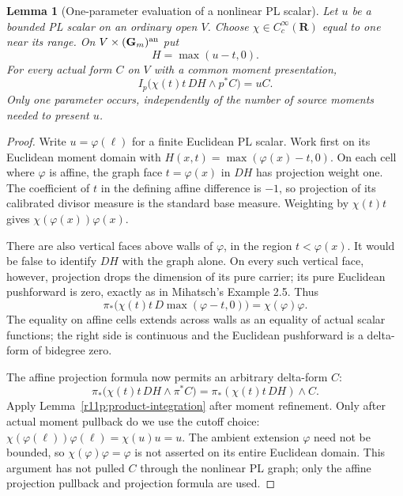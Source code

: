 \documentclass[11pt,a4paper]{article}
\newtheorem{lemma}[theorem]{Lemma}
\theoremstyle{definition}
\theoremstyle{remark}
\begin{document}
\begin{lemma}[One-parameter evaluation of a nonlinear PL scalar]
\label{r11p:one-parameter}
Let $u$ be a bounded PL scalar on an ordinary open $V$.  Choose
$\chi\in C_c^\infty(\mathbf R)$ equal to one near its range.  On
$V\times(\mathbf G_m)^{\rm an}$ put
\[
                         H=\max(u-t,0).
\]
For every actual form $C$ on $V$ with a common moment presentation,
\[
                  I_p\bigl(\chi(t)t\,DH\wedge p^*C\bigr)=uC.
\tag{MT8}\label{r11p:graph-evaluation}
\]
Only one parameter occurs, independently of the number of source
moments needed to present $u$.
\end{lemma}

\begin{proof}
Write $u=\varphi(\ell)$ for a finite Euclidean PL scalar.  Work first
on its Euclidean moment domain with $H(x,t)=\max(\varphi(x)-t,0)$.
On each cell where $\varphi$ is affine, the graph face $t=\varphi(x)$
in $DH$ has projection weight one.  The coefficient of $t$ in the
defining affine difference is $-1$, so projection of its calibrated
divisor measure is the standard base measure.  Weighting by $\chi(t)t$
gives $\chi(\varphi(x))\varphi(x)$.

There are also vertical faces above walls of $\varphi$, in the region
$t<\varphi(x)$.  It would be false to identify $DH$ with the graph
alone.  On every such vertical face, however, projection drops the
dimension of its pure carrier; its pure Euclidean pushforward is
zero, exactly as in Mihatsch's Example 2.5.  Thus
\[
               \pi_*\bigl(\chi(t)t\,D\max(\varphi-t,0)\bigr)
                                  =\chi(\varphi)\varphi.
\]
The equality on affine cells extends across walls as an equality of
actual scalar functions; the right side is continuous and the
Euclidean pushforward is a delta-form of bidegree zero.

The affine projection formula now permits an arbitrary delta-form
$C$:
\[
 \pi_*\bigl(\chi(t)t\,DH\wedge\pi^*C\bigr)
       =\pi_*(\chi(t)t\,DH)\wedge C.
\]
Apply Lemma~\ref{r11p:product-integration} after moment refinement.
Only after actual moment pullback do we use the cutoff choice:
$\chi(\varphi(\ell))\varphi(\ell)=\chi(u)u=u$.
The ambient extension $\varphi$ need not be bounded, so
$\chi(\varphi)\varphi=\varphi$ is not asserted on its entire
Euclidean domain.
This argument has not pulled $C$ through the nonlinear PL graph;
only the affine projection pullback and projection formula are used.
\end{proof}
\end{document}
